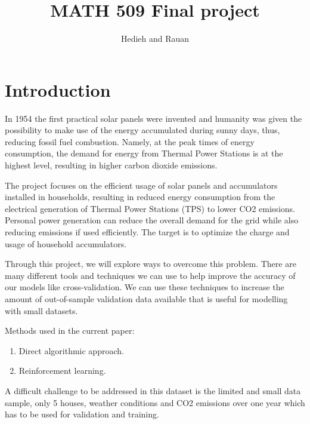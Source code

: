 \documentclass{article}
\title{MATH 509 Final project}
\author{Hedieh and Rauan}
\numberwithin{equation}{subsection}
\begin{document}
\maketitle

\begin{abstract}

\end{abstract}

\tableofcontents
\newpage

\section{Introduction}

In 1954 the first practical solar panels were invented and humanity was given the possibility to make use of the energy accumulated during sunny days, thus, reducing fossil fuel combustion. Namely, at the peak times of energy consumption, the demand for energy from Thermal Power Stations is at the highest level, resulting in higher carbon dioxide emissions. 

The project focuses on the efficient usage of solar panels and accumulators installed in households, resulting in reduced energy consumption from the electrical generation of Thermal Power Stations (TPS) to lower CO2 emissions. Personal power generation can reduce the overall demand for the grid while also reducing emissions if used efficiently. The target is to optimize the charge and usage of household accumulators.

Through this project, we will explore ways to overcome this problem. There are many different tools and techniques we can use to help improve the accuracy of our models like cross-validation. We can use these techniques to increase the amount of out-of-sample validation data available that is useful for modelling with small datasets.

Methods used in the current paper:
\begin{enumerate}
	\item Direct algorithmic approach.
	\item Reinforcement learning.
\end{enumerate}


A difficult challenge to be addressed in this dataset is the limited and small data sample, only 5 houses, weather conditions and CO2 emissions over one year which has to be used for validation and training.  
\end{document}
